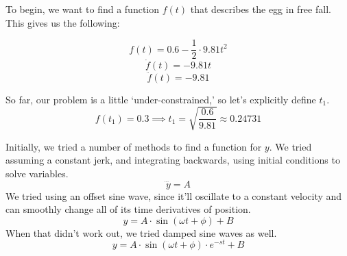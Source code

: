 \documentclass[nofoot,pdf-a,balance,colorlinks,upint,subscriptcorrection,varvw,mathalfa=cal=boondoxo]{asmeconf}
\begin{document}
        To begin, we want to find a function $f\left(t\right)$ that describes the egg in free fall. This gives us the following:

        \begin{equation}
            f\left(t\right) = 0.6 - \frac{1}{2} \cdot 9.81 t^2
        \end{equation}
        \begin{equation}
            \dot{f}\left(t\right) = - 9.81 t
        \end{equation}
        \begin{equation}
            \ddot{f}\left(t\right) = - 9.81
        \end{equation}

         So far, our problem is a little `under-constrained,' so let's explicitly define $t_1$.
         \begin{equation} 
             f(t_1) = 0.3 \implies t_1 = \sqrt{\frac{0.6}{9.81}} \approx 0.24731
         \end{equation}
     
       Initially, we tried a number of methods to find a function for $y$. We tried assuming a constant jerk, and integrating backwards, using initial conditions to solve variables. 
    \begin{equation*}
        \dddot{y} = A
    \end{equation*}
        We tried using an offset sine wave, since it'll oscillate to a constant velocity and can smoothly change all of its time derivatives of position.
    \begin{equation*}
        y = A \cdot \sin{\left(\omega t + \phi\right)} + B
    \end{equation*}
        When that didn't work out, we tried damped sine waves as well.
    \begin{equation*}
        y = A \cdot \sin{\left(\omega t + \phi\right)}\cdot e^{-st} + B
    \end{equation*}
\end{document}
